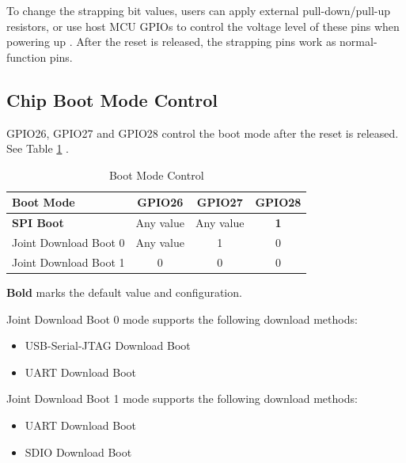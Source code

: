 \documentclass[main\_\_EN.tex]{subfiles}
\begin{document}
To change the strapping bit values, users can apply external pull-down/pull-up resistors, or use host MCU GPIOs to control the voltage level of these pins when powering up \chipname{}. After the reset is released, the strapping pins work as normal-function pins.

\subsection{Chip Boot Mode Control}
\label{sec:bootModeControl}

GPIO26, GPIO27 and GPIO28 control the boot mode after the reset is released. See Table \ref{tab:bootctrl-boot-mode-control} \textit{}.

\begin{table}[H]
    \centering
    \caption{Boot Mode Control}
    \label{tab:bootctrl-boot-mode-control}

    \begin{threeparttable}
    \begin{tabular}{ | l | c | c | c | }
    \hline
        \rowcolor{lightgray}
        \textbf{Boot Mode} & \textbf{GPIO26} & \textbf{GPIO27} & \textbf{GPIO28} \\\hline
        \textbf{SPI Boot}\tnote{1} & Any value & Any value & \textbf{1}\tnote{1} \\\hline
        Joint Download Boot 0\tnote{2} & Any value & 1 & 0 \\\hline
        Joint Download Boot 1\tnote{3} & 0 & 0 & 0 \\\hline
        \end{tabular}

        \begin{tablenotes}
            \item[1] \textbf{Bold} marks the default value and configuration.
            \item[2] Joint Download Boot 0 mode supports the following download methods:
                \begin{itemize}
                    \item USB-Serial-JTAG Download Boot
                    \item UART Download Boot
                \end{itemize}
            \item[3] Joint Download Boot 1 mode supports the following download methods:
                \begin{itemize}
                    \item UART Download Boot
                    \item SDIO Download Boot
                \end{itemize}
        \end{tablenotes}
     \end{threeparttable}
\end{table}
\end{document}
